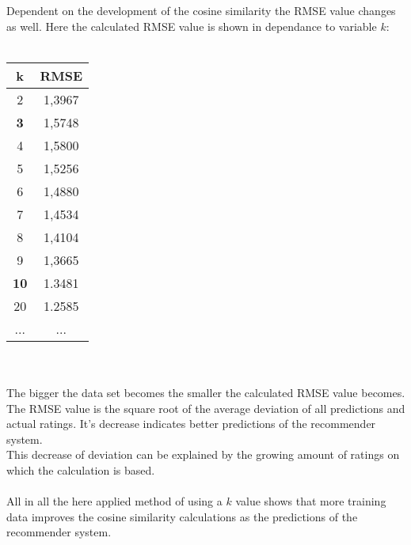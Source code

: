 \documentclass[a4paper,12pt,twoside]{article}
\begin{document}
Dependent on the development of the cosine similarity the RMSE value changes as well. Here the calculated RMSE value is shown in dependance to variable $k$:\\
\\
\begin{tabular}{c|c}
\textbf{k} & \textbf{RMSE} \\ \hline
	2 &  1,3967\\
	\textbf{3} & 1,5748 \\
	4 & 1,5800\\
	5 &  1,5256 \\
	6 &  1,4880\\
	7 & 1,4534\\
	8 &  1,4104  \\
	9 &  1,3665\\
	\textbf{10} & 1.3481 \\
	20 &  1.2585\\
	... & ... \\
\end{tabular} \\
\\
The bigger the data set becomes the smaller the calculated RMSE value becomes. The RMSE value is the square root of the average deviation of all predictions and actual ratings. It's decrease indicates better predictions of the recommender system.\\
This decrease of deviation can be explained by the growing amount of ratings on which the calculation is based.\\   
\\
All in all the here applied method of using a $k$ value shows that more training data improves the cosine similarity calculations as the predictions of the recommender system.	 
\end{document}
